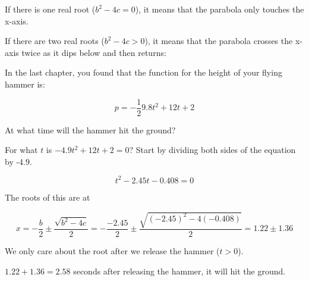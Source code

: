 If there is one real root ($b^2 - 4c = 0$), it means that the parabola only touches the x-axis.


If there are two real roots ($b^2 - 4c > 0$), it means that the parabola crosses the x-axis twice as it dips below and then returns:


\begin{Exercise}[title={Roots of a Quadratic}, label=solve_quadratic]

  In the last chapter, you found that the function for the height of your flying hammer is:

  $$p = -\frac{1}{2}9.8 t^2 + 12t + 2$$

  At what time will the hammer hit the ground?

  
\end{Exercise}
\begin{Answer}[ref=solve_quadratic]

  For what $t$ is  $-4.9 t^2 + 12t + 2 = 0$?  Start by dividing both sides of the equation by -4.9.

  $$t^2 - 2.45 t - 0.408 = 0$$

  The roots of this are at

  $$x = -\frac{b}{2} \pm \frac{\sqrt{b^2 - 4c}}{2} = -\frac{-2.45}{2} \pm \frac{\sqrt{(-2.45)^2 - 4(-0.408)}}{2} = 1.22 \pm 1.36$$

  We only care about the root after we release the hammer ($t > 0$).

  $1.22 + 1.36 = 2.58$ seconds after releasing the hammer, it will hit the ground.

  
\end{Answer}


